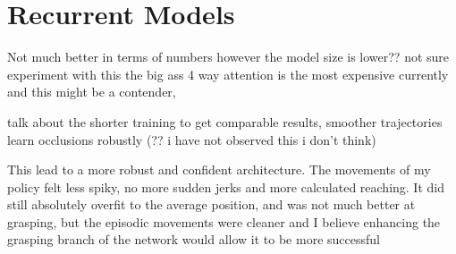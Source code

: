 \section{Recurrent Models}

Not much better in terms of numbers however the model size is lower?? not sure experiment with this the big ass 4 way attention is the most expensive currently and this might be a contender,

talk about the shorter training to get comparable results, smoother trajectories learn occlusions robustly (?? i have not observed this i don't think)


This lead to a more robust and confident architecture. The movements of my policy felt less spiky, no more sudden jerks and more calculated reaching. It did still absolutely overfit to the average position, and was not much better at grasping, but the episodic movements were cleaner and I believe enhancing the grasping branch of the network would allow it to be more successful 

